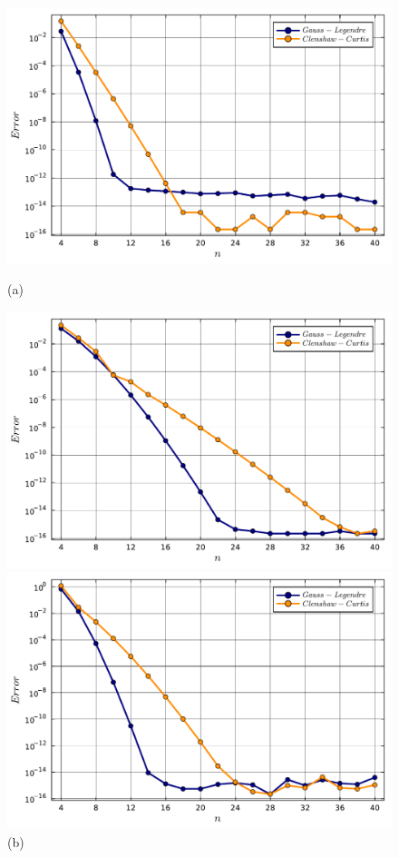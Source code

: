 \documentclass[letterpaper, 12pt]{article}
\numberwithin{equation}{section}    %
\begin{document}
\begin{figure}[!ht]
    \centering
    \begin{minipage}[b]{0.47\textwidth}
        \includegraphics[width=\textwidth]{5411.pdf}
        \caption*{(a)}
    \end{minipage}
    \hspace{0.5cm}
    \begin{minipage}[b]{0.47\textwidth}
        \includegraphics[width=\textwidth]{5412.pdf}
        \caption*{(b)}
    \end{minipage}
    \begin{minipage}[b]{0.47\textwidth}
        \includegraphics[width=\textwidth]{5415.pdf}

\end{minipage}
\end{figure}
\end{document}
